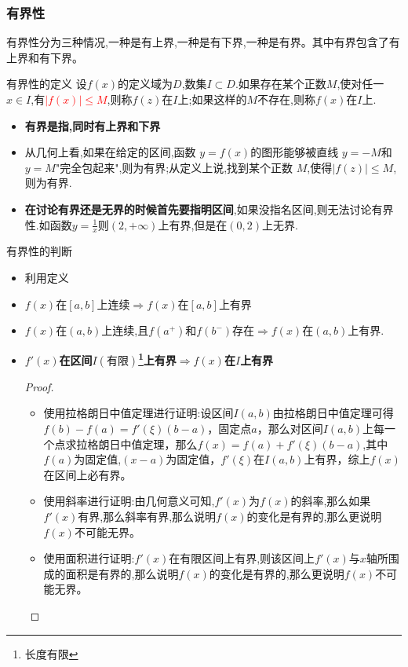\documentclass[12pt, a4paper, oneside, UTF8]{ctexbook}  %
\begin{document}
\begin{sloppypar}
    \subsubsection{有界性}
    有界性分为三种情况,一种是有上界,一种是有下界,一种是有界。其中有界包含了有上界和有下界。
    \begin{defn}{有界性的定义}{}
        设$f(x)$的定义域为$D$,数集$I \subset D$.如果存在某个正数$M$,使对任一$x \in I$,有\textcolor{red}{$|f(x)| \leqslant M$},则称$f(z)$在$I$上;如果这样的$M$不存在,则称$f(x)$在$I$上.
    \end{defn}
    \begin{itemize}
        \item \textbf{有界是指,同时有上界和下界}
        \item 从几何上看,如果在给定的区间,函数 $y=f(x)$的图形能够被直线 $y=-M$和 $y=M$"完全包起来",则为有界;从定义上说,找到某个正数 $M$,使得$|f(z)| \leqslant M$,则为有界.
        \item \textbf{在讨论有界还是无界的时候首先要指明区间},如果没指名区间,则无法讨论有界性.如函数$y=\frac{1}{x}$则$(2,+\infty)$上有界,但是在$(0,2)$上无界.
    \end{itemize}
    \begin{criterion}{有界性的判断}{}
        \begin{itemize}
            \item 利用定义
            \item $f(x)$在$[a,b]$上连续$\Rightarrow f(x)$在$[a,b]$上有界
            \item $f(x)$在$(a,b)$上连续,且$f(a^+)$和$f(b^-)$存在$\Rightarrow f(x)$在$(a,b)$上有界.
            \item \textbf{$f'(x)$在区间$I(\text{有限})$\footnote{长度有限}上有界$\Rightarrow f(x)$在$I$上有界}
                  \begin{proof}
                      \begin{itemize}
                          \item 使用拉格朗日中值定理进行证明:设区间$I(a,b)$由拉格朗日中值定理可得$f(b)-f(a)=f'(\xi)(b-a)$，固定点$a$，那么对区间$I(a,b)$上每一个点求拉格朗日中值定理，那么$f(x)=f(a)+f'(\xi)(b-a)$,其中$f(a)$为固定值,$(x-a)$为固定值，$f'(\xi)$在$I(a,b)$上有界，综上$f(x)$在区间上必有界。
                          \item 使用斜率进行证明:由几何意义可知,$f'(x)$为$f(x)$的斜率,那么如果$f'(x)$有界,那么斜率有界,那么说明$f(x)$的变化是有界的,那么更说明$f(x)$不可能无界。
                          \item 使用面积进行证明:$f'(x)$在有限区间上有界,则该区间上$f'(x)$与$x$轴所围成的面积是有界的,那么说明$f(x)$的变化是有界的,那么更说明$f(x)$不可能无界。

\end{itemize}
\end{proof}
\end{itemize}
\end{criterion}
\end{sloppypar}
\end{document}
